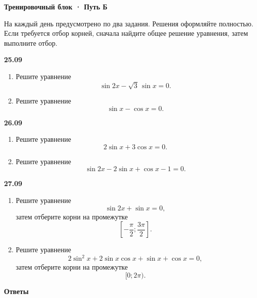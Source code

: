 \documentclass[a4paper,12pt]{article}
\newcommand{\sect}[1]{%
  \vspace{0.45em}%
  {\Large\bfseries\color{darkaccent}#1}\par
  \vspace{0.2em}%
  \noindent{\color{rulegray}\rule{\linewidth}{0.6pt}}%
  \vspace{0.35em}%
}
\newcommand{\subsect}[1]{%
  \vspace{0.35em}%
  {\large\bfseries\color{accent}#1}\par
  \vspace{0.1em}%
}
\begin{document}
\sect{Тренировочный блок · Путь Б}

На каждый день предусмотрено по два задания.
Решения оформляйте полностью.
Если требуется отбор корней, сначала найдите общее решение уравнения,
затем выполните отбор.

\subsect{25.09}

\begin{enumerate}[label=\textbf{\arabic*.}]
  \item
  Решите уравнение
  \[
  \sin 2x-\sqrt3\,\sin x=0.
  \]

  \item
  Решите уравнение
  \[
  \sin x-\cos x=0.
  \]
\end{enumerate}

\subsect{26.09}

\begin{enumerate}[label=\textbf{\arabic*.},resume]
  \item
  Решите уравнение
  \[
  2\sin x+3\cos x=0.
  \]

  \item
  Решите уравнение
  \[
  \sin 2x-2\sin x+\cos x-1=0.
  \]
\end{enumerate}

\subsect{27.09}

\begin{enumerate}[label=\textbf{\arabic*.},resume]
  \item
  Решите уравнение
  \[
  \sin 2x+\sin x=0,
  \]
  затем отберите корни на промежутке
  \[
  \left[-\frac{\pi}{2};\frac{3\pi}{2}\right].
  \]

  \item
  Решите уравнение
  \[
  2\sin^2x+2\sin x\cos x+\sin x+\cos x=0,
  \]
  затем отберите корни на промежутке
  \[
  [0;2\pi).
  \]
\end{enumerate}

\clearpage
\thispagestyle{fancy}

\sect{Ответы}
\end{document}
